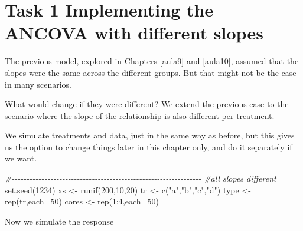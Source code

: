 \documentclass[
]{book}
\newenvironment{Shaded}{\begin{snugshade}}{\end{snugshade}}
\newcommand{\AttributeTok}[1]{\textcolor[rgb]{0.77,0.63,0.00}{#1}}
\newcommand{\CommentTok}[1]{\textcolor[rgb]{0.56,0.35,0.01}{\textit{#1}}}
\newcommand{\DecValTok}[1]{\textcolor[rgb]{0.00,0.00,0.81}{#1}}
\newcommand{\FunctionTok}[1]{\textcolor[rgb]{0.00,0.00,0.00}{#1}}
\newcommand{\NormalTok}[1]{#1}
\newcommand{\OtherTok}[1]{\textcolor[rgb]{0.56,0.35,0.01}{#1}}
\newcommand{\SpecialCharTok}[1]{\textcolor[rgb]{0.00,0.00,0.00}{#1}}
\newcommand{\StringTok}[1]{\textcolor[rgb]{0.31,0.60,0.02}{#1}}
\begin{document}
\hypertarget{task-1-implementing-the-ancova-with-different-slopes}{%
\section{Task 1 Implementing the ANCOVA with different slopes}\label{task-1-implementing-the-ancova-with-different-slopes}}

The previous model, explored in Chapters \ref{aula9} and \ref{aula10}, assumed that the slopes were the same across the different groups. But that might not be the case in many scenarios.

What would change if they were different? We extend the previous case to the scenario where the slope of the relationship is also different per treatment.

We simulate treatments and data, just in the same way as before, but this gives us the option to change things later in this chapter only, and do it separately if we want.

\begin{Shaded}
\begin{Highlighting}[]
\CommentTok{\#{-}{-}{-}{-}{-}{-}{-}{-}{-}{-}{-}{-}{-}{-}{-}{-}{-}{-}{-}{-}{-}{-}{-}{-}{-}{-}{-}{-}{-}{-}{-}{-}{-}{-}{-}{-}{-}{-}{-}{-}{-}{-}{-}{-}{-}{-}{-}{-}{-}{-}{-}{-}{-}{-}{-}{-}{-}{-}{-}{-}{-}{-}{-}{-}}
\CommentTok{\#all slopes different}
\FunctionTok{set.seed}\NormalTok{(}\DecValTok{1234}\NormalTok{)}
\NormalTok{xs }\OtherTok{\textless{}{-}} \FunctionTok{runif}\NormalTok{(}\DecValTok{200}\NormalTok{,}\DecValTok{10}\NormalTok{,}\DecValTok{20}\NormalTok{)}
\NormalTok{tr }\OtherTok{\textless{}{-}} \FunctionTok{c}\NormalTok{(}\StringTok{"a"}\NormalTok{,}\StringTok{"b"}\NormalTok{,}\StringTok{"c"}\NormalTok{,}\StringTok{"d"}\NormalTok{)}
\NormalTok{type }\OtherTok{\textless{}{-}} \FunctionTok{rep}\NormalTok{(tr,}\AttributeTok{each=}\DecValTok{50}\NormalTok{)}
\NormalTok{cores }\OtherTok{\textless{}{-}} \FunctionTok{rep}\NormalTok{(}\DecValTok{1}\SpecialCharTok{:}\DecValTok{4}\NormalTok{,}\AttributeTok{each=}\DecValTok{50}\NormalTok{)}
\end{Highlighting}
\end{Shaded}

Now we simulate the response
\end{document}
